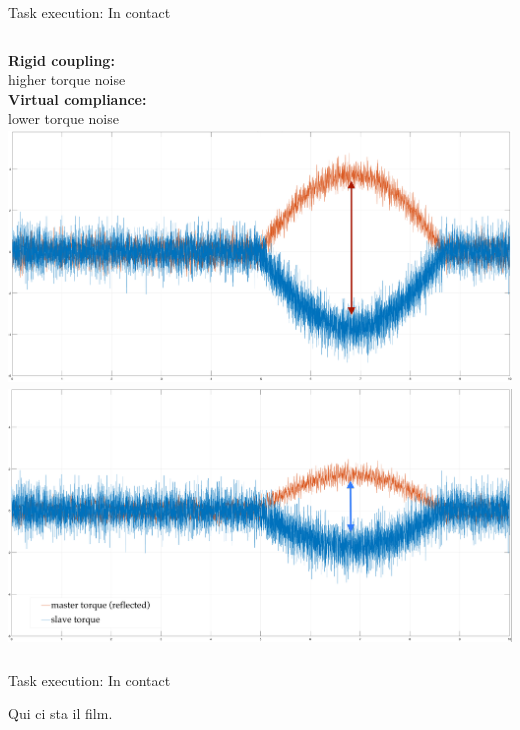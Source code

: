 \documentclass[10pt]{beamer}
\begin{document}
\begin{frame}{Task execution: In contact}
  \smallskip
  \begin{columns}
    \color{Orange}\textbf{Rigid coupling:}\\
    higher torque noise\\
    \bigskip
    \bigskip
    \bigskip
    \color{LightBlue}\textbf{Virtual compliance:}\\
    lower torque noise
    \includegraphics[width=\textwidth,
    height=0.43\textwidth]{../reportTeleop/Images/rigidContactReacTorArrow}
    \smallskip
    \includegraphics[width=\textwidth,
    height=0.43\textwidth]{../reportTeleop/Images/setPointContactReacTorArrow}\\

 \end{columns}
\end{frame}


\begin{frame}{Task execution: In contact}

Qui ci sta il film.
\end{frame}
\end{document}
